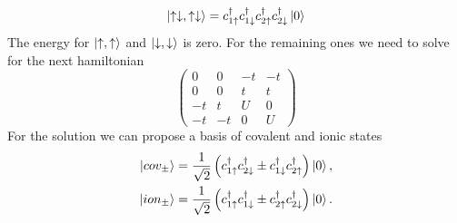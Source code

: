 \begin{questions}
\begin{solution}
\begin{equation}
  \ket{\uparrow \downarrow, \uparrow \downarrow} = c_{1\uparrow}^\dagger c_{1\downarrow}^\dagger c_{2\uparrow}^\dagger c_{2\downarrow}^\dagger \ket{0}
\end{equation}
The energy for $\ket{\uparrow , \uparrow }$ and $\ket{\downarrow,  \downarrow}$ is zero.
For the remaining ones we need to solve for the next hamiltonian
\begin{equation}
  \begin{pmatrix}
    0 & 0 & -t & -t \\
    0 & 0 & t & t \\
    -t & t & U & 0 \\
    -t & -t & 0 & U
  \end{pmatrix}
\end{equation}
For the solution we can propose a basis of covalent and ionic states
\begin{eqnarray}
  \ket{cov_\pm} = \frac{1}{\sqrt{2}} \left(c_{1\uparrow}^\dagger c_{2\downarrow}^\dagger\pm  c_{1\downarrow}^\dagger c_{2\uparrow}^\dagger \right)\ket{0},\\
  \ket{ion_\pm} = \frac{1}{\sqrt{2}} \left(c_{1\uparrow}^\dagger c_{1\downarrow}^\dagger\pm  c_{2\uparrow}^\dagger c_{2\downarrow}^\dagger \right)\ket{0}.
\end{eqnarray}


\end{solution}
\end{questions}
